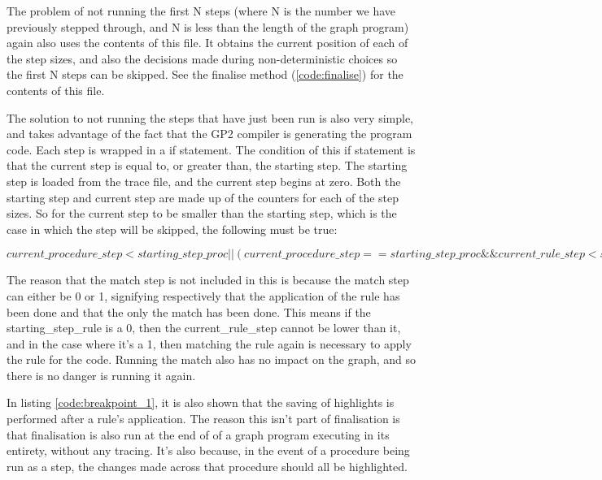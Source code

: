 \documentclass{UoYCSproject}
\begin{document}
The problem of not running the first N steps (where N is the number we have previously stepped through, and N is less than the length of the graph program) again also uses the contents of this file. It obtains the current position of each of the step sizes, and also the decisions made during non-deterministic choices so the first N steps can be skipped. See the finalise method (\ref{code:finalise}) for the contents of this file.

The solution to not running the steps that have just been run is also very simple, and takes advantage of the fact that the GP2 compiler is generating the program code. Each step is wrapped in a if statement. The condition of this if statement is that the current step is equal to, or greater than, the starting step. The starting step is loaded from the trace file, and the current step begins at zero. Both the starting step and current step are made up of the counters for each of the step sizes. So for the current step to be smaller than the starting step, which is the case in which the step will be skipped, the following must be true:

$current\_procedure\_step < starting\_step\_proc ||
(current\_procedure\_step == starting\_step\_proc \&\& current\_rule\_step < starting\_step\_rule);$

The reason that the match step is not included in this is because the match step can either be 0 or 1, signifying respectively that the application of the rule has been done and that the only the match has been done. This means if the starting\_step\_rule is a 0, then the current\_rule\_step cannot be lower than it, and in the case where it's a 1, then matching the rule again is necessary to apply the rule for the code. Running the match also has no impact on the graph, and so there is no danger is running it again.

In listing \ref{code:breakpoint_1}, it is also shown that the saving of highlights is performed after a rule's application. The reason this isn't part of finalisation is that finalisation is also run at the end of of a graph program executing in its entirety, without any tracing. It's also because, in the event of a procedure being run as a step, the changes made across that procedure should all be highlighted.
\end{document}
